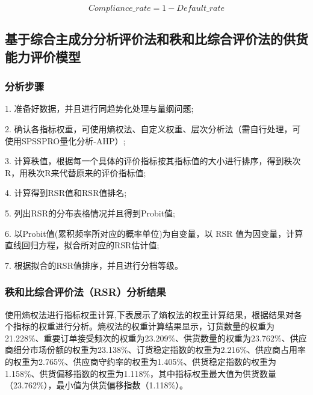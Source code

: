 \documentclass[UTF8]{ctexart}
\begin{document}
\begin{equation}
	Compliance\_{rate} = 1- Default\_rate
\end{equation}


\subsection{基于综合主成分分析评价法和秩和比综合评价法的供货能力评价模型}

\subsubsection{分析步骤}

1. 准备好数据，并且进行同趋势化处理与量纲问题;

2. 确认各指标权重，可使用熵权法、自定义权重、层次分析法（需自行处理，可使用SPSSPRO量化分析-AHP）;

3. 计算秩值，根据每一个具体的评价指标按其指标值的大小进行排序，得到秩次R，用秩次R来代替原来的评价指标值;

4. 计算得到RSR值和RSR值排名;

5. 列出RSR的分布表格情况并且得到Probit值;

6. 以Probit值(累积频率所对应的概率单位)为自变量，以 RSR 值为因变量，计算直线回归方程，拟合所对应的RSR估计值;

7. 根据拟合的RSR值排序，并且进行分档等级。

\subsubsection{秩和比综合评价法（RSR）分析结果}

使用熵权法进行指标权重计算,下表展示了熵权法的权重计算结果，根据结果对各个指标的权重进行分析。熵权法的权重计算结果显示，订货数量的权重为21.228\%、重要订单接受频次的权重为23.209\%、供货数量的权重为23.762\%、供应商细分市场份额的权重为23.138\%、订货稳定指数的权重为2.216\%、供应商占用率的权重为2.765\%、供应商守约率的权重为1.405\%、供货稳定指数的权重为1.158\%、供货偏移指数的权重为1.118\%，其中指标权重最大值为供货数量（23.762\%），最小值为供货偏移指数（1.118\%）。
\end{document}
